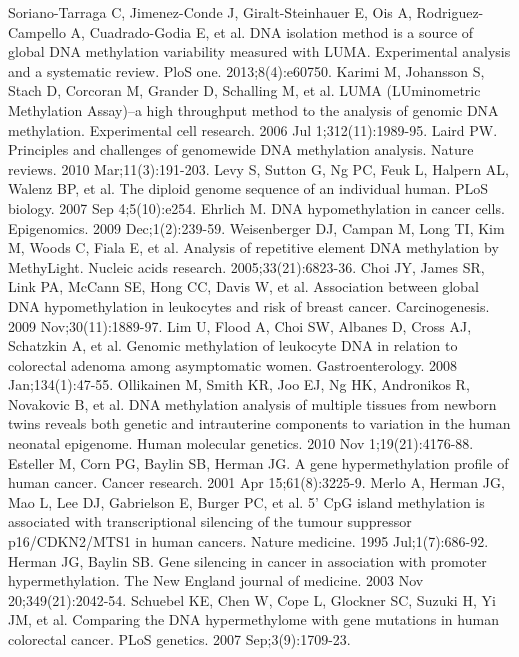 \begin{thebibliography}{12}
		Soriano-Tarraga C, Jimenez-Conde J, Giralt-Steinhauer E, Ois A, Rodriguez-Campello A, Cuadrado-Godia E, et al. DNA isolation method is a source of global DNA methylation variability measured with LUMA. Experimental analysis and a systematic review. PloS one. 2013;8(4):e60750.
		Karimi M, Johansson S, Stach D, Corcoran M, Grander D, Schalling M, et al. LUMA (LUminometric Methylation Assay)--a high throughput method to the analysis of genomic DNA methylation. Experimental cell research. 2006 Jul 1;312(11):1989-95.
		Laird PW. Principles and challenges of genomewide DNA methylation analysis. Nature reviews. 2010 Mar;11(3):191-203.
		Levy S, Sutton G, Ng PC, Feuk L, Halpern AL, Walenz BP, et al. The diploid genome sequence of an individual human. PLoS biology. 2007 Sep 4;5(10):e254.
		Ehrlich M. DNA hypomethylation in cancer cells. Epigenomics. 2009 Dec;1(2):239-59.
		Weisenberger DJ, Campan M, Long TI, Kim M, Woods C, Fiala E, et al. Analysis of repetitive element DNA methylation by MethyLight. Nucleic acids research. 2005;33(21):6823-36.
		Choi JY, James SR, Link PA, McCann SE, Hong CC, Davis W, et al. Association between global DNA hypomethylation in leukocytes and risk of breast cancer. Carcinogenesis. 2009 Nov;30(11):1889-97.
		Lim U, Flood A, Choi SW, Albanes D, Cross AJ, Schatzkin A, et al. Genomic methylation of leukocyte DNA in relation to colorectal adenoma among asymptomatic women. Gastroenterology. 2008 Jan;134(1):47-55.
		Ollikainen M, Smith KR, Joo EJ, Ng HK, Andronikos R, Novakovic B, et al. DNA methylation analysis of multiple tissues from newborn twins reveals both genetic and intrauterine components to variation in the human neonatal epigenome. Human molecular genetics. 2010 Nov 1;19(21):4176-88.
		Esteller M, Corn PG, Baylin SB, Herman JG. A gene hypermethylation profile of human cancer. Cancer research. 2001 Apr 15;61(8):3225-9.
		Merlo A, Herman JG, Mao L, Lee DJ, Gabrielson E, Burger PC, et al. 5' CpG island methylation is associated with transcriptional silencing of the tumour suppressor p16/CDKN2/MTS1 in human cancers. Nature medicine. 1995 Jul;1(7):686-92.
		Herman JG, Baylin SB. Gene silencing in cancer in association with promoter hypermethylation. The New England journal of medicine. 2003 Nov 20;349(21):2042-54.
		Schuebel KE, Chen W, Cope L, Glockner SC, Suzuki H, Yi JM, et al. Comparing the DNA hypermethylome with gene mutations in human colorectal cancer. PLoS genetics. 2007 Sep;3(9):1709-23.

\end{thebibliography}
